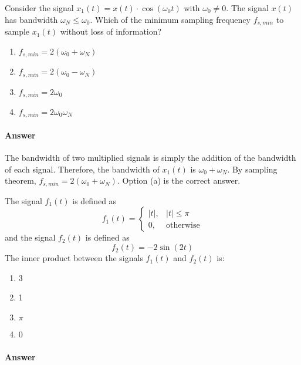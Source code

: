 \documentclass[12pt,a4paper]{article}
\begin{document}
\begin{q}{}
Consider the signal $x_{1}(t) = x(t) \cdot \cos(\omega_0 t)$ with $\omega_0 \neq 0$. The signal $x(t)$ has bandwidth $\omega_N \leq \omega_0$. Which of the minimum sampling frequency $f_{s, min}$ to sample $x_{1}(t)$ without loss of information?

\begin{enumerate}[label=(\alph*)]
    \item $f_{s,min} = 2(\omega_{0}+\omega_{N})$
    \item $f_{s,min} = 2(\omega_{0}-\omega_{N})$
    \item $f_{s,min} = 2\omega_{0}$
    \item $f_{s,min} = 2\omega_{0}\omega_{N}$
\end{enumerate}

\paragraph{Answer}
The bandwidth of two multiplied signals is simply the addition of the bandwidth of each signal. Therefore, the bandwidth of $x_1(t)$ is $\omega_0 + \omega_N$. By sampling theorem, $f_{s,min} = 2(\omega_{0}+\omega_{N})$. Option (a) is the correct answer.
\end{q}
\begin{q}{}
The signal $f_1(t)$ is defined as
\[
    f_1(t) = \begin{cases}
        \lvert t \rvert, & \lvert t \rvert \leq \pi \\
        0, & \text{otherwise}
    \end{cases}
\]
and the signal $f_2 (t)$ is defined as
\[
    f_2 (t) = -2 \sin(2t)
\]
The inner product between the signals $f_1(t)$ and $f_2(t)$ is:

\begin{enumerate}[label=(\alph*)]
    \item 3
    \item 1
    \item $\pi$
    \item 0
\end{enumerate} 


\paragraph{Answer}

\end{q}
\end{document}
